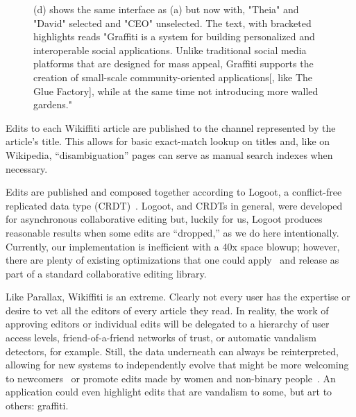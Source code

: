 \begin{figure}[t]
{    (d) shows the same interface as (a) but now with, "Theia" and "David" selected and "CEO" unselected. The text, with bracketed highlights reads "Graffiti is a system for building personalized and interoperable social applications. Unlike traditional social media platforms that are designed for mass appeal, Graffiti supports the creation of small-scale community-oriented applications[, like The Glue Factory], while at the same time not introducing more walled gardens."
    }
    \label{case-studies:fig:wikiffiti}
\end{figure}

Edits to each Wikiffiti article are published to
the channel represented by the article's title.
This allows for basic exact-match lookup on titles and, like on Wikipedia,
``disambiguation'' pages can serve as manual search indexes when necessary.

Edits are published and composed together according to Logoot,
a conflict-free replicated data type (CRDT)~\cite{logoot,crdts}.
Logoot, and CRDTs in general, were developed for asynchronous collaborative editing
but, luckily for us, Logoot produces reasonable results when
some edits are ``dropped,'' as we do here intentionally.
Currently, our implementation is inefficient with a 40x space blowup;
however, there are plenty of existing optimizations that one could apply~\cite{logootbetter}
and release as part of a standard collaborative editing library.

Like Parallax, Wikiffiti is an extreme. Clearly not every user
has the expertise or desire to vet all the editors of
every article they read. In reality, the work of approving editors
or individual edits will be delegated to
a hierarchy of user access levels,
friend-of-a-friend networks of trust,
or automatic vandalism detectors, for example.
Still, the data underneath can always be reinterpreted, allowing
for new systems to independently evolve that
might be more welcoming to newcomers~\cite{wikibourgeoisie, wikirisedecline}
or promote edits made by women and non-binary people~\cite{wikigender}.
An application could even highlight edits that are vandalism to some,
but art to others: graffiti.
